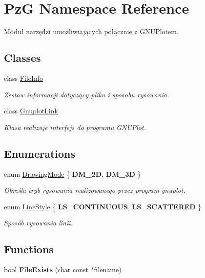 \hypertarget{namespace_pz_g}{}\section{PzG Namespace Reference}
\label{namespace_pz_g}


Moduł narzędzi umożliwiających połącznie z G\+N\+U\+Plotem.  


\subsection*{Classes}
\begin{DoxyCompactItemize}
\item 
class \hyperlink{class_pz_g_1_1_file_info}{File\+Info}
\begin{DoxyCompactList}\small\item\em Zestaw informacji dotyczący pliku i sposobu rysowania. \end{DoxyCompactList}\item 
class \hyperlink{class_pz_g_1_1_gnuplot_link}{Gnuplot\+Link}
\begin{DoxyCompactList}\small\item\em Klasa realizuje interfejs do programu G\+N\+U\+Plot. \end{DoxyCompactList}\end{DoxyCompactItemize}
\subsection*{Enumerations}
\begin{DoxyCompactItemize}
\item 
enum \hyperlink{namespace_pz_g_a4360c76a1dbf714a19a0d97fe56e0660}{Drawing\+Mode} \{ {\bfseries D\+M\+\_\+2D}, 
{\bfseries D\+M\+\_\+3D}
 \}\begin{DoxyCompactList}\small\item\em Określa tryb rysowania realizowanego przez program {\ttfamily gnuplot}. \end{DoxyCompactList}
\item 
enum \hyperlink{namespace_pz_g_ab0580cdb6bfe9e51d7de2588bc824076}{Line\+Style} \{ {\bfseries L\+S\+\_\+\+C\+O\+N\+T\+I\+N\+U\+O\+US}, 
{\bfseries L\+S\+\_\+\+S\+C\+A\+T\+T\+E\+R\+ED}
 \}\begin{DoxyCompactList}\small\item\em Sposób rysowania linii. \end{DoxyCompactList}
\end{DoxyCompactItemize}
\subsection*{Functions}
\begin{DoxyCompactItemize}
\item 
\mbox{\label{namespace_pz_g_a64a72627607d0c3f47a61d19744eebef}} 
bool {\bfseries File\+Exists} (char const $\ast$filename)
\end{DoxyCompactItemize}
